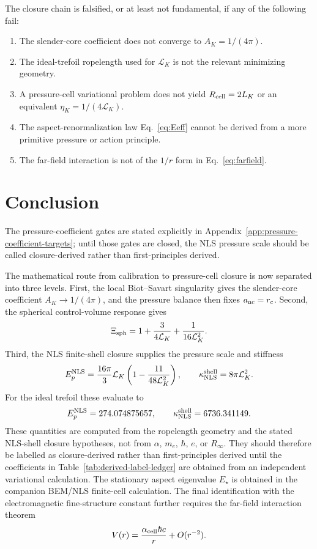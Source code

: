 \documentclass[11pt]{article}
\newcommand{\LK}{\mathcal L_K}
\newcommand{\EpNLS}{E_p^{\rm NLS}}
\newcommand{\kappaNLS}{\kappa_{\rm NLS}^{\rm shell}}
\begin{document}
The closure chain is falsified, or at least not fundamental, if any of the following fail:
\begin{enumerate}[label=(F\arabic*)]
\item The slender-core coefficient does not converge to \(A_K=1/(4\pi)\).
\item The ideal-trefoil ropelength used for \(\LK\) is not the relevant minimizing geometry.
\item A pressure-cell variational problem does not yield \(R_{\rm cell}=2L_K\) or an equivalent
      \(\eta_K=1/(4\LK)\).
\item The aspect-renormalization law Eq.~\eqref{eq:Eeff} cannot be derived from a more primitive
      pressure or action principle.
\item The far-field interaction is not of the \(1/r\) form in Eq.~\eqref{eq:farfield}.
\end{enumerate}

\section{Conclusion}

The pressure-coefficient gates are stated explicitly in Appendix~\ref{app:pressure-coefficient-targets}; until those gates are closed, the NLS pressure scale should be called closure-derived rather than first-principles derived.


The mathematical route from calibration to pressure-cell closure is now separated into three
levels.  First, the local Biot--Savart singularity gives the slender-core coefficient
\(A_K\to1/(4\pi)\), and the pressure balance then fixes \(a_{\rm nc}=r_c\).  Second, the
spherical control-volume response gives
\[
  \Xi_{\rm sph}
  =
  1+\frac{3}{4\mathcal L_K}+\frac{1}{16\mathcal L_K^2}.
\]
Third, the NLS finite-shell closure supplies the pressure scale and stiffness
\[
  \EpNLS
  =
  \frac{16\pi}{3}\mathcal L_K
  \left(1-\frac{11}{48\mathcal L_K^2}\right),
  \qquad
  \kappaNLS=8\pi\mathcal L_K^2.
\]
For the ideal trefoil these evaluate to
\[
  \EpNLS=274.074875657,
  \qquad
  \kappaNLS=6736.341149.
\]
These quantities are computed from the ropelength geometry and the stated NLS-shell closure hypotheses, not from
\(\alpha\), \(m_e\), \(\hbar\), \(e\), or \(R_\infty\).  They should therefore be labelled as closure-derived rather than first-principles derived until the coefficients in Table~\ref{tab:derived-label-ledger} are obtained from an independent variational calculation.  The stationary aspect eigenvalue
\(E_\star\) is obtained in the companion BEM/NLS finite-cell calculation.  The final
identification with the electromagnetic fine-structure constant further requires the
far-field interaction theorem
\[
  V(r)=\frac{\alpha_{\rm cell}\hbar c}{r}+O(r^{-2}).
\]
\end{document}
